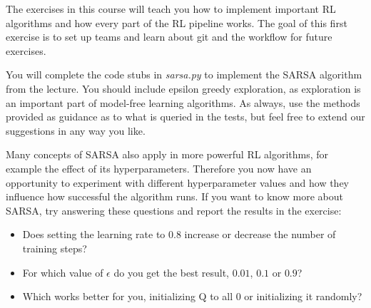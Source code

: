 \documentclass{exam}
\begin{document}
\noindent
The exercises in this course will teach you how to implement important RL algorithms and how every part of the RL pipeline works. The goal of this first exercise is to set up teams and learn about git and the workflow for future exercises.

\begin{questions}
	You will complete the code stubs in \emph{sarsa.py} to implement the SARSA algorithm from the lecture. You should include epsilon greedy exploration, as exploration is an important part of model-free learning algorithms. As always, use the methods provided as guidance as to what is queried in the tests, but feel free to extend our suggestions in any way you like.
	
	Many concepts of SARSA also apply in more powerful RL algorithms, for example the effect of its hyperparameters. Therefore you now have an opportunity to experiment with different hyperparameter values and how they influence how successful the algorithm runs. If you want to know more about SARSA, try answering these questions and report the results in the exercise:
	\begin{itemize}
		\item Does setting the learning rate to $0.8$ increase or decrease the number of training steps?
		\item For which value of $\epsilon$ do you get the best result, $0.01$, $0.1$ or $0.9$?
		\item Which works better for you, initializing Q to all $0$ or initializing it randomly?
	\end{itemize}
\end{questions}
\end{document}
